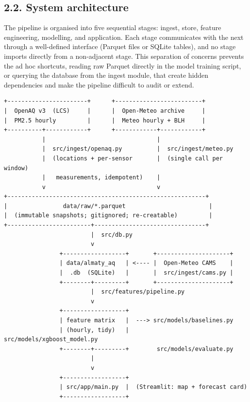 \subsection{2.2. System architecture}\label{system-architecture}

The pipeline is organised into five sequential stages: ingest, store, feature engineering, modelling, and application. Each stage communicates with the next through a well-defined interface (Parquet files or SQLite tables), and no stage imports directly from a non-adjacent stage. This separation of concerns prevents the ad hoc shortcuts, reading raw Parquet directly in the model training script, or querying the database from the ingest module, that create hidden dependencies and make the pipeline difficult to audit or extend.

\begin{verbatim}
+-----------------------+      +-------------------------+
|  OpenAQ v3  (LCS)     |      |  Open-Meteo archive     |
|  PM2.5 hourly         |      |  Meteo hourly + BLH     |
+----------+------------+      +------------+------------+
           |                                |
           |  src/ingest/openaq.py          |  src/ingest/meteo.py
           |  (locations + per-sensor       |  (single call per window)
           |   measurements, idempotent)    |
           v                                v
+---------------------------------------------------------+
|                data/raw/*.parquet                        |
|  (immutable snapshots; gitignored; re-creatable)         |
+------------------------+--------------------------------+
                         |  src/db.py
                         v
                +------------------+       +---------------------+
                | data/almaty_aq   | <---- |  Open-Meteo CAMS    |
                |  .db  (SQLite)   |       |  src/ingest/cams.py |
                +--------+---------+       +---------------------+
                         |  src/features/pipeline.py
                         v
                +------------------+
                | feature matrix   |  ---> src/models/baselines.py
                | (hourly, tidy)   |        src/models/xgboost_model.py
                +--------+---------+        src/models/evaluate.py
                         |
                         v
                +------------------+
                | src/app/main.py  |  (Streamlit: map + forecast card)
                +------------------+
\end{verbatim}

